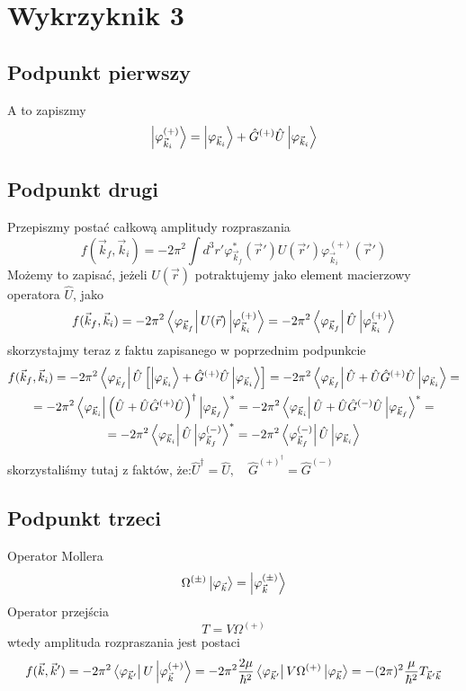 \documentclass[a4paper,12pt]{article}
\begin{document}
    \section{Wykrzyknik 3}
    	\subsection{Podpunkt pierwszy}
    	A to zapiszmy
    	$$
    		\ket{\varphi^{(+)}_{\vec{k}_i}} = \ket{\varphi_{\vec{k}_i}} + \hat{G}^{(+)}\hat{U}\ket{\varphi_{\vec{k}_i}}
    	$$
    	\subsection{Podpunkt drugi}
    	Przepiszmy postać całkową amplitudy rozpraszania
    	$$
    		f(\vec{k}_f,\vec{k}_i) = -2\pi^2 \int d^3r' \varphi_{\vec{k}_f}^*(\vec{r}')U(\vec{r}')\varphi_{\vec{k}_i}^{(+)}(\vec{r}') 
    	$$
    	Możemy to zapisać, jeżeli $U(\vec{r})$ potraktujemy jako element macierzowy operatora $\hat{U}$, jako 
    	$$
    		f(\vec{k}_f,\vec{k}_i) = -2\pi^2\bra{\varphi_{\vec{k}_f}}U(\vec{r})\ket{\varphi_{\vec{k}_i}^{(+)}} = -2\pi^2\bra{\varphi_{\vec{k}_f}}\hat{U}\ket{\varphi_{\vec{k}_i}^{(+)}}
    	$$
    	skorzystajmy teraz z faktu zapisanego w poprzednim podpunkcie
    	$$
    	\begin{gathered}
    		f(\vec{k}_f,\vec{k}_i)  = -2\pi^2\bra{\varphi_{\vec{k}_f}}\hat{U}\left[\ket{\varphi_{\vec{k}_i}} + \hat{G}^{(+)}\hat{U}\ket{\varphi_{\vec{k}_i}}\right]= 
    		-2\pi^2\bra{\varphi_{\vec{k}_f}}\hat{U}+\hat{U}\hat{G}^{(+)}\hat{U}\ket{\varphi_{\vec{k}_i}} =\\ 
    		= -2\pi^2 \bra{\varphi_{\vec{k}_i}}\left(\hat{U}+\hat{U}\hat{G}^{(+)}\hat{U}\right)^\dagger\ket{\varphi_{\vec{k}_f}}^* = 
    		-2\pi^2 \bra{\varphi_{\vec{k}_i}}\hat{U}+\hat{U}\hat{G}^{(-)}\hat{U}\ket{\varphi_{\vec{k}_f}}^*= \\= -2\pi^2 \bra{\varphi_{\vec{k}_i}}\hat{U}\ket{\varphi^{(-)}_{\vec{k}_f}}^*
    		 =-2\pi^2 \bra{\varphi^{(-)}_{\vec{k}_f}}\hat{U}\ket{\varphi_{\vec{k}_i}}
    	\end{gathered}
    	$$
    	skorzystaliśmy tutaj z faktów, że:$\hat{U}^\dagger =\hat{U},\quad \hat{G}^{(+)^\dagger} = \hat{G}^{(-)}$
    	\subsection{Podpunkt trzeci}
    	Operator Mollera
    	$$
    		\Omega^{(\pm)}\ket{\varphi_{\vec{k}}} = \ket{\varphi^{(\pm)}_{\vec{k}}}
    	$$
    	Operator przejścia
    	$$
    		T = V\Omega^{(+)}
    	$$
    	wtedy amplituda rozpraszania jest postaci
    	$$
    		f(\vec{k},\vec{k}') = -2\pi^2\bra{\varphi_{\vec{k}'}}U\ket{\varphi^{(+)}_{\vec{k}}} = -2\pi^2\frac{2\mu}{\hbar^2}\bra{\varphi_{\vec{k}'}}V\Omega^{(+)}\ket{\varphi_{\vec{k}}}
    		= -(2\pi)^2\frac{\mu}{\hbar^2}T_{\vec{k}'\vec{k}}
    	$$
\end{document}
